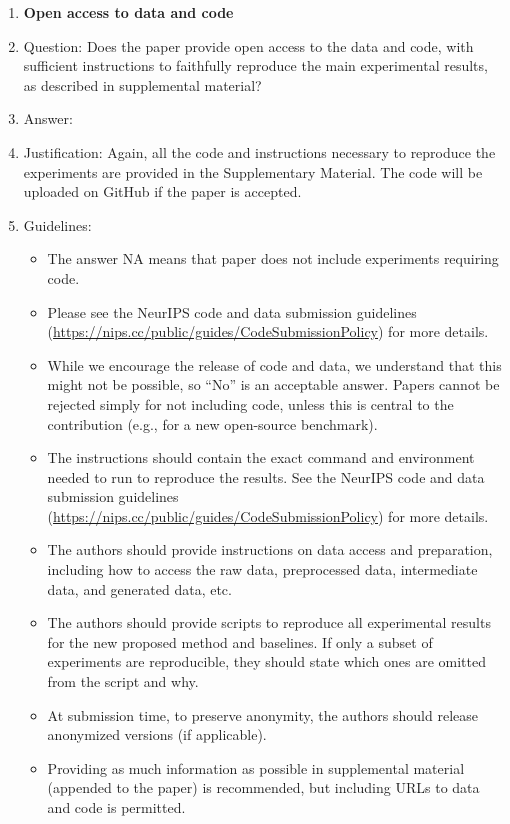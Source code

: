 \documentclass{article}
\begin{document}
\begin{enumerate}
\item {\bf Open access to data and code}
    \item[] Question: Does the paper provide open access to the data and code, with sufficient instructions to faithfully reproduce the main experimental results, as described in supplemental material?
    \item[] Answer: \answerYes{} %
    \item[] Justification: 
    Again, all the code and instructions necessary to reproduce the experiments are provided in the Supplementary Material.
    The code will be uploaded on GitHub if the paper is accepted.
    \item[] Guidelines:
    \begin{itemize}
        \item The answer NA means that paper does not include experiments requiring code.
        \item Please see the NeurIPS code and data submission guidelines (\url{https://nips.cc/public/guides/CodeSubmissionPolicy}) for more details.
        \item While we encourage the release of code and data, we understand that this might not be possible, so “No” is an acceptable answer. Papers cannot be rejected simply for not including code, unless this is central to the contribution (e.g., for a new open-source benchmark).
        \item The instructions should contain the exact command and environment needed to run to reproduce the results. See the NeurIPS code and data submission guidelines (\url{https://nips.cc/public/guides/CodeSubmissionPolicy}) for more details.
        \item The authors should provide instructions on data access and preparation, including how to access the raw data, preprocessed data, intermediate data, and generated data, etc.
        \item The authors should provide scripts to reproduce all experimental results for the new proposed method and baselines. If only a subset of experiments are reproducible, they should state which ones are omitted from the script and why.
        \item At submission time, to preserve anonymity, the authors should release anonymized versions (if applicable).
        \item Providing as much information as possible in supplemental material (appended to the paper) is recommended, but including URLs to data and code is permitted.
    \end{itemize}



\end{enumerate}
\end{document}
